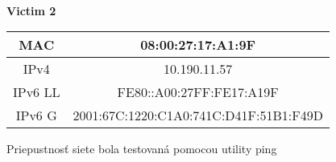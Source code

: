 \documentclass[a4paper,11pt]{article}
\begin{document}
\ \\
\textbf{Victim 2}
\begin{center}
\begin{tabular}{ |c|c| } 
 \hline
 MAC & 08:00:27:17:A1:9F \\
 \hline 
 IPv4 & 10.190.11.57 \\ 
 \hline 
 IPv6 LL & FE80::A00:27FF:FE17:A19F \\ 
 \hline 
 IPv6 G & 2001:67C:1220:C1A0:741C:D41F:51B1:F49D \\
 \hline
\end{tabular}
\end{center}

Priepustnosť siete bola testovaná pomocou utility ping

\newpage

\def\refname{Literatúra}

\end{document}
